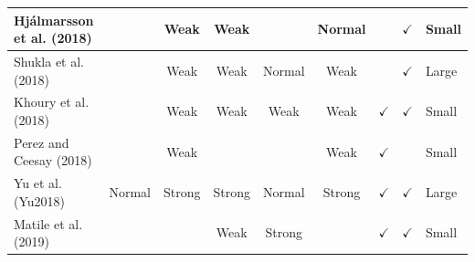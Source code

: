 \documentclass[../access.tex]{subfiles}
\begin{document}
\begin{table}[htbp]
\begin{adjustwidth}{-1cm}{}
\begin{tabular}{m{4.4cm} c c c c c c c >{\centering\arraybackslash}m{0.7cm}}
            \hline
            \footnotesize{Hj\'{a}lmarsson et al. (2018) \cite{Hjalmarsson2018}} & {}                                                                                                & {Weak}                                           & {Weak}                 & {}                           & {Normal}                  & {}                      & $ \checkmark $            & \footnotesize{Small} \\
            \hline
            \footnotesize{Shukla et al. (2018) \cite{Shukla2018}}               & {}                                                                                                & {Weak}                                           & {Weak}                 & {Normal}                     & {Weak}                    & {}                      & $ \checkmark $            & \footnotesize{Large} \\
            \hline
            \footnotesize{Khoury et al. (2018) \cite{Khoury2018}}               & {}                                                                                                & {Weak}                                           & {Weak}                 & {Weak}                       & {Weak}                    & $ \checkmark $          & $ \checkmark $            & \footnotesize{Small} \\
            \hline
            \footnotesize{Perez and Ceesay (2018) \cite{Perez2018}}             & {}                                                                                                & {Weak}                                           & {}                     & {}                           & {Weak}                    & $ \checkmark $          & {}                        & \footnotesize{Small} \\
            \hline
            \footnotesize{Yu et al. (Yu2018) \cite{Yu2018}}                     & {Normal}                                                                                          & {Strong}                                         & {Strong}               & {Normal}                     & {Strong}                  & $ \checkmark $          & $ \checkmark $            & \footnotesize{Large} \\
            \hline
            \footnotesize{Matile et al. (2019) \cite{Matile2019}}               & {}                                                                                                & {}                                               & {Weak}                 & {Strong}                     & {}                        & $ \checkmark $          & $ \checkmark $            & \footnotesize{Small} \\

\end{tabular}
\end{adjustwidth}
\end{table}
\end{document}
